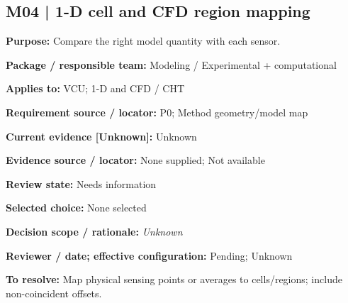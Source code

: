 \documentclass[11pt]{article}
\begin{document}
\par\noindent\begin{minipage}{\textwidth}\small\setlength{\parskip}{2pt}
\subsection*{M04 | 1-D cell and CFD region mapping}
\textbf{Purpose:} Compare the right model quantity with each sensor.\par
\textbf{Package / responsible team:} Modeling / Experimental + computational\par
\textbf{Applies to:} VCU; 1-D and CFD / CHT\par
\textbf{Requirement source / locator:} P0; Method geometry/model map\par
\textbf{Current evidence [Unknown]:} Unknown\par
\textbf{Evidence source / locator:} None supplied; Not available\par
\textbf{Review state:} Needs information\par
\textbf{Selected choice:} None selected\par
\textbf{Decision scope / rationale:} \textit{Unknown}\par
\textbf{Reviewer / date; effective configuration:} Pending; Unknown\par
\textbf{To resolve:} Map physical sensing points or averages to cells/regions; include non-coincident offsets.\par
\end{minipage}\par\vspace{5pt}
\end{document}
